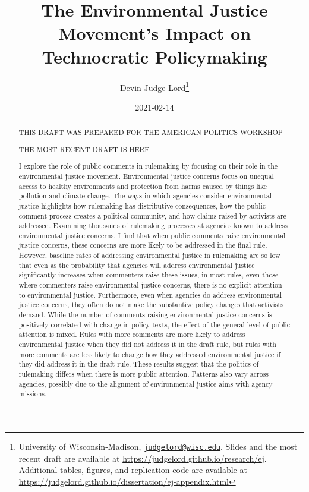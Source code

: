 \documentclass[
      12pt,
        ]{article}
\title{The Environmental Justice Movement's Impact on Technocratic Policymaking}
\author{ %
            Devin Judge-Lord\footnote{University of Wisconsin-Madison, \href{mailto:judgelord@wisc.edu}{\nolinkurl{judgelord@wisc.edu}}. Slides and the most recent draft are available at \url{https://judgelord.github.io/research/ej}. Additional tables, figures, and replication code are available at \url{https://judgelord.github.io/dissertation/ej-appendix.html}} 
            }
\date{2021-02-14}
\begin{document}
 


  \maketitle




  \begin{abstract}
    \noindent THIS DRAFT WAS PREPARED FOR THE AMERICAN POLITICS WORKSHOP

THE MOST RECENT DRAFT IS \href{https://judgelord.github.io/research/ej/}{HERE}

\bigskip

I explore the role of public comments in rulemaking by focusing on their role in the environmental justice movement. Environmental justice concerns focus on unequal access to healthy environments and protection from harms caused by things like pollution and climate change. The ways in which agencies consider environmental justice highlights how rulemaking has distributive consequences, how the public comment process creates a political community, and how claims raised by activists are addressed. Examining thousands of rulemaking processes at agencies known to address environmental justice concerns, I find that when public comments raise environmental justice concerns, these concerns are more likely to be addressed in the final rule. However, baseline rates of addressing environmental justice in rulemaking are so low that even as the probability that agencies will address environmental justice significantly increases when commenters raise these issues, in most rules, even those where commenters raise environmental justice concerns, there is no explicit attention to environmental justice. Furthermore, even when agencies do address environmental justice concerns, they often do not make the substantive policy changes that activists demand. While the number of comments raising environmental justice concerns is positively correlated with change in policy texts, the effect of the general level of public attention is mixed. Rules with more comments are more likely to address environmental justice when they did not address it in the draft rule, but rules with more comments are less likely to change how they addressed environmental justice if they did address it in the draft rule. These results suggest that the politics of rulemaking differs when there is more public attention. Patterns also vary across agencies, possibly due to the alignment of environmental justice aims with agency missions. 

    

  \end{abstract}
\end{document}
